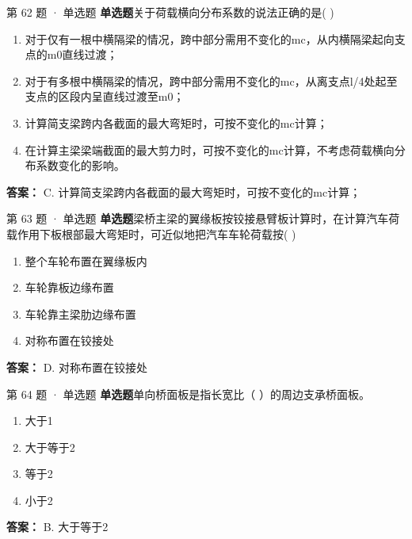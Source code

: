 \documentclass[UTF8,zihao=-4,openany]{ctexbook}
\newenvironment{choices}{\begin{enumerate}[label=\Alph*.,leftmargin=9mm,labelsep=3mm,itemsep=2pt,topsep=4pt]}{\end{enumerate}}
\newcommand{\qtype}[1]{\textcolor{brand}{\sffamily\bfseries #1}}
\begin{document}
\begin{questionbox}{第 62 题 · 单选题}
\qtype{单选题}\quad 关于荷载横向分布系数的说法正确的是( )
\begin{choices}
\item 对于仅有一根中横隔梁的情况，跨中部分需用不变化的mc，从内横隔梁起向支点的m0直线过渡；
\item 对于有多根中横隔梁的情况，跨中部分需用不变化的mc，从离支点l/4处起至支点的区段内呈直线过渡至m0；
\item 计算简支梁跨内各截面的最大弯矩时，可按不变化的mc计算；
\item 在计算主梁梁端截面的最大剪力时，可按不变化的mc计算，不考虑荷载横向分布系数变化的影响。
\end{choices}
\begin{answerbox}
\textbf{答案：} C. 计算简支梁跨内各截面的最大弯矩时，可按不变化的mc计算；
\end{answerbox}
\end{questionbox}

\begin{questionbox}{第 63 题 · 单选题}
\qtype{单选题}\quad 梁桥主梁的翼缘板按铰接悬臂板计算时，在计算汽车荷载作用下板根部最大弯矩时，可近似地把汽车车轮荷载按( )
\begin{choices}
\item 整个车轮布置在翼缘板内
\item 车轮靠板边缘布置
\item 车轮靠主梁肋边缘布置
\item 对称布置在铰接处
\end{choices}
\begin{answerbox}
\textbf{答案：} D. 对称布置在铰接处
\end{answerbox}
\end{questionbox}

\begin{questionbox}{第 64 题 · 单选题}
\qtype{单选题}\quad 单向桥面板是指长宽比（ ）的周边支承桥面板。
\begin{choices}
\item 大于1
\item 大于等于2
\item 等于2
\item 小于2
\end{choices}
\begin{answerbox}
\textbf{答案：} B. 大于等于2
\end{answerbox}
\end{questionbox}
\end{document}
